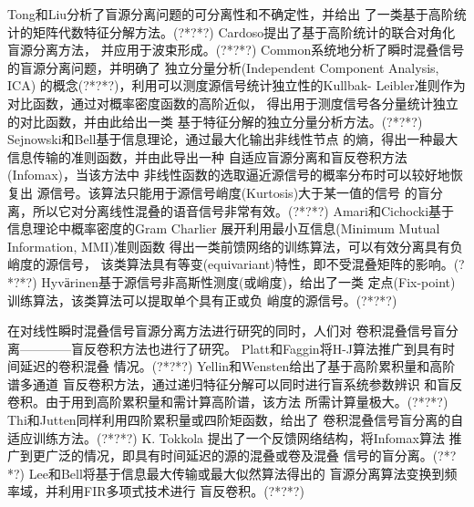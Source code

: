 Tong和Liu分析了盲源分离问题的可分离性和不确定性，并给出
了一类基于高阶统计的矩阵代数特征分解方法。(?*?*?)
Cardoso提出了基于高阶统计的联合对角化盲源分离方法，
并应用于波束形成。(?*?*?)
Common系统地分析了瞬时混叠信号的盲源分离问题，并明确了
独立分量分析(Independent Component Analysis, ICA)
的概念(?*?*?)，利用可以测度源信号统计独立性的Kullbak-
Leibler准则作为对比函数，通过对概率密度函数的高阶近似，
得出用于测度信号各分量统计独立的对比函数，并由此给出一类
基于特征分解的独立分量分析方法。(?*?*?)
Sejnowski和Bell基于信息理论，通过最大化输出非线性节点
的熵，得出一种最大信息传输的准则函数，并由此导出一种
自适应盲源分离和盲反卷积方法(Infomax)，当该方法中
非线性函数的选取逼近源信号的概率分布时可以较好地恢复出
源信号。该算法只能用于源信号峭度(Kurtosis)大于某一值的信号
的盲分离，所以它对分离线性混叠的语音信号非常有效。(?*?*?)
Amari和Cichocki基于信息理论中概率密度的Gram Charlier
展开利用最小互信息(Minimum Mutual Information, MMI)准则函数
得出一类前馈网络的训练算法，可以有效分离具有负峭度的源信号，
该类算法具有等变(equivariant)特性，即不受混叠矩阵的影响。(?*?*?)
Hyvӓrinen基于源信号非高斯性测度(或峭度)，给出了一类
定点(Fix-point)训练算法，该类算法可以提取单个具有正或负
峭度的源信号。(?*?*?)

在对线性瞬时混叠信号盲源分离方法进行研究的同时，人们对
卷积混叠信号盲分离————盲反卷积方法也进行了研究。
Platt和Faggin将H-J算法推广到具有时间延迟的卷积混叠
情况。(?*?*?)
Yellin和Wensten给出了基于高阶累积量和高阶谱多通道
盲反卷积方法，通过递归特征分解可以同时进行盲系统参数辨识
和盲反卷积。由于用到高阶累积量和需计算高阶谱，该方法
所需计算量极大。(?*?*?)
Thi和Jutten同样利用四阶累积量或四阶矩函数，给出了
卷积混叠信号盲分离的自适应训练方法。(?*?*?)
K. Tokkola 提出了一个反馈网络结构，将Infomax算法
推广到更广泛的情况，即具有时间延迟的源的混叠或卷及混叠
信号的盲分离。(?*?*?)
Lee和Bell将基于信息最大传输或最大似然算法得出的
盲源分离算法变换到频率域，并利用FIR多项式技术进行
盲反卷积。(?*?*?)

